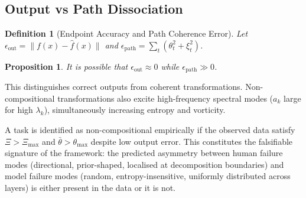 \documentclass[12pt, a4paper]{article}
\newtheorem{definition}[theorem]{Definition}
\newtheorem{proposition}[theorem]{Proposition}
\theoremstyle{remark}
\theoremstyle{definition}
\begin{document}
\subsection{Output vs Path Dissociation}

\begin{definition}[Endpoint Accuracy and Path Coherence Error]
Let $\epsilon_{\mathrm{out}} = \|f(x) - \hat{f}(x)\|$ and
$\epsilon_{\mathrm{path}} = \sum_t (\theta_t^2 + \xi_t^2)$.
\end{definition}

\begin{proposition}
It is possible that $\epsilon_{\mathrm{out}} \approx 0$ while $\epsilon_{\mathrm{path}} \gg 0$.
\end{proposition}

This distinguishes correct outputs from coherent transformations.  Non-compositional
transformations also excite high-frequency spectral modes ($a_k$ large for high
$\lambda_k$), simultaneously increasing entropy and vorticity.

A task is identified as non-compositional empirically if the observed data satisfy
$\Xi > \Xi_{\max}$ and $\bar\theta > \theta_{\max}$ despite low output error.  This
constitutes the falsifiable signature of the framework: the predicted asymmetry between
human failure modes (directional, prior-shaped, localised at decomposition boundaries)
and model failure modes (random, entropy-insensitive, uniformly distributed across layers)
is either present in the data or it is not.
\end{document}
